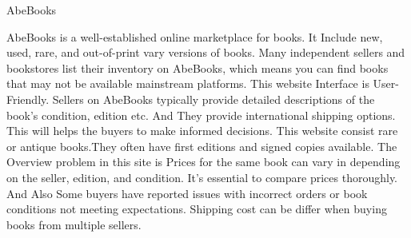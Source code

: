  
     AbeBooks	

	AbeBooks is a well-established online marketplace for books. 
	It Include new, used, rare, and out-of-print vary versions of books. 
	Many independent sellers and bookstores list their inventory on AbeBooks, which means you can find books that may not be available mainstream platforms.
 	This website Interface is User-Friendly. 
	Sellers on AbeBooks typically provide detailed descriptions of the book's condition, edition etc. 
	And They provide international shipping options. This will helps the buyers to make informed decisions.
	 This website consist rare or antique books.They often have first editions and signed copies available. 
	The Overview problem in this site is Prices for the same book can vary in depending on the seller, edition, and condition.
	It's essential to compare prices thoroughly. 
	And Also Some buyers have reported issues with incorrect orders or book conditions not meeting expectations.
	 Shipping cost can be differ when buying books from multiple sellers.


